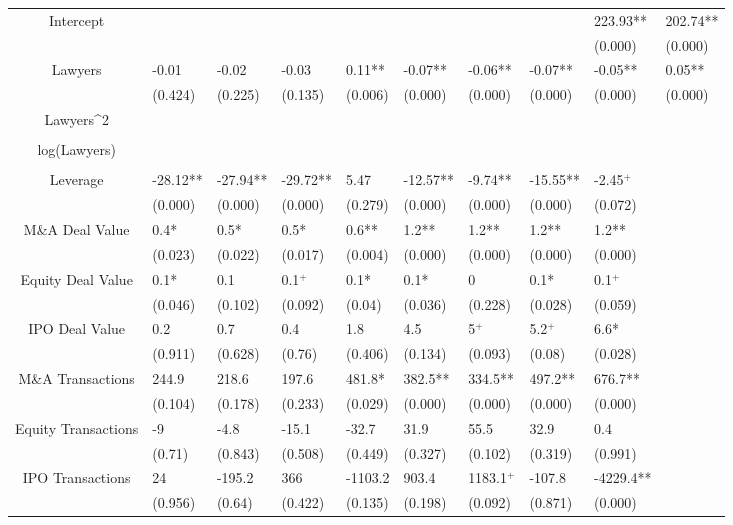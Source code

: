\documentclass{article}
\begin{document}
\begin{table}[H]
\begin{tabular}{|clllllllll|}
Intercept &  &  &  &  &  &  &  & 223.93** & 202.74** \\ 
   &  &  &  &  &  &  &  & (0.000) & (0.000) \\ 
  Lawyers & -0.01 & -0.02 & -0.03 & 0.11** & -0.07** & -0.06** & -0.07** & -0.05** & 0.05** \\ 
   & (0.424) & (0.225) & (0.135) & (0.006) & (0.000) & (0.000) & (0.000) & (0.000) & (0.000) \\ 
  Lawyers^2 &  &  &  &  &  &  &  &  &  \\ 
   &  &  &  &  &  &  &  &  &  \\ 
  log(Lawyers) &  &  &  &  &  &  &  &  &  \\ 
   &  &  &  &  &  &  &  &  &  \\ 
  Leverage & -28.12** & -27.94** & -29.72** & 5.47 & -12.57** & -9.74** & -15.55** & -2.45$^{+}$ &  \\ 
   & (0.000) & (0.000) & (0.000) & (0.279) & (0.000) & (0.000) & (0.000) & (0.072) &  \\ 
  M\&A Deal Value & 0.4* & 0.5* & 0.5* & 0.6** & 1.2** & 1.2** & 1.2** & 1.2** &  \\ 
   & (0.023) & (0.022) & (0.017) & (0.004) & (0.000) & (0.000) & (0.000) & (0.000) &  \\ 
  Equity Deal Value & 0.1* & 0.1 & 0.1$^{+}$ & 0.1* & 0.1* & 0 & 0.1* & 0.1$^{+}$ &  \\ 
   & (0.046) & (0.102) & (0.092) & (0.04) & (0.036) & (0.228) & (0.028) & (0.059) &  \\ 
  IPO Deal Value & 0.2 & 0.7 & 0.4 & 1.8 & 4.5 & 5$^{+}$ & 5.2$^{+}$ & 6.6* &  \\ 
   & (0.911) & (0.628) & (0.76) & (0.406) & (0.134) & (0.093) & (0.08) & (0.028) &  \\ 
  M\&A Transactions & 244.9 & 218.6 & 197.6 & 481.8* & 382.5** & 334.5** & 497.2** & 676.7** &  \\ 
   & (0.104) & (0.178) & (0.233) & (0.029) & (0.000) & (0.000) & (0.000) & (0.000) &  \\ 
  Equity Transactions & -9 & -4.8 & -15.1 & -32.7 & 31.9 & 55.5 & 32.9 & 0.4 &  \\ 
   & (0.71) & (0.843) & (0.508) & (0.449) & (0.327) & (0.102) & (0.319) & (0.991) &  \\ 
  IPO Transactions & 24 & -195.2 & 366 & -1103.2 & 903.4 & 1183.1$^{+}$ & -107.8 & -4229.4** &  \\ 
   & (0.956) & (0.64) & (0.422) & (0.135) & (0.198) & (0.092) & (0.871) & (0.000) &  \\ 

\end{tabular}
\end{table}
\end{document}

